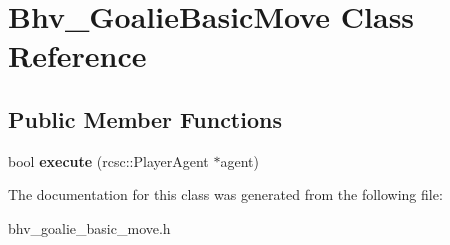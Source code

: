 \hypertarget{classBhv__GoalieBasicMove}{
\section{Bhv\_\-GoalieBasicMove Class Reference}
\label{classBhv__GoalieBasicMove}
}
\subsection*{Public Member Functions}
\begin{DoxyCompactItemize}
\item 
\hypertarget{classBhv__GoalieBasicMove_aa8554fba0b1f8d474c30cc399e75a877}{
bool {\bfseries execute} (rcsc::PlayerAgent $\ast$agent)}
\label{classBhv__GoalieBasicMove_aa8554fba0b1f8d474c30cc399e75a877}

\end{DoxyCompactItemize}


The documentation for this class was generated from the following file:\begin{DoxyCompactItemize}
\item 
bhv\_\-goalie\_\-basic\_\-move.h\end{DoxyCompactItemize}
